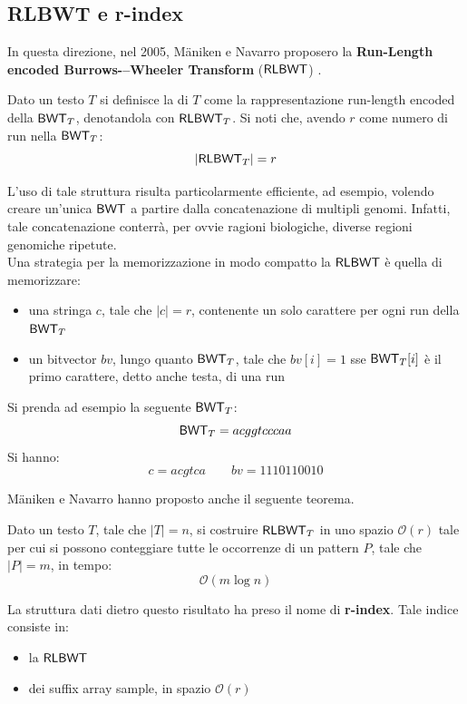 \subsection{RLBWT e r-index}
In questa direzione, nel 2005, M\"{a}niken e Navarro proposero la
\textbf{Run-Length encoded Burrows-–Wheeler Transform} ($\mbox{\rm {\sf RLBWT}}$)
\cite{rlbwt}.
\begin{definizione}
  Dato un testo $T$ si definisce la \RLBWT di $T$
  come la rappresentazione run-length encoded della $\mbox{\rm {\sf BWT}}_T$,
  denotandola con $\mbox{\rm {\sf RLBWT}}_T$. Si noti che, avendo $r$ come numero di run nella
  $\mbox{\rm {\sf BWT}}_T$: 
  \begin{equation}
    \label{eq:rlbwt1}
    |\mbox{\rm {\sf RLBWT}}_T|=r
  \end{equation}
\end{definizione}
L'uso di tale
struttura risulta particolarmente efficiente, ad esempio, volendo creare
un'unica $\mbox{\rm {\sf BWT}}$ a partire dalla concatenazione di multipli
genomi. Infatti, tale
concatenazione conterrà, per ovvie ragioni biologiche, diverse regioni genomiche
ripetute. \\
Una strategia per la memorizzazione in modo compatto la $\mbox{\rm {\sf RLBWT}}$ è quella
di memorizzare: 
\begin{itemize}
  \item una stringa $c$, tale che $|c|=r$, contenente un solo carattere per ogni
  run della $\mbox{\rm {\sf BWT}}_T$
  \item un bitvector $bv$, lungo quanto $\mbox{\rm {\sf BWT}}_T$, tale che $bv[i]=1$ sse
  $\mbox{\rm {\sf BWT}}_T[i]$ è il primo carattere, detto anche testa, di una run 
\end{itemize}
\begin{esempio}
  Si prenda ad esempio la seguente $\mbox{\rm {\sf BWT}}_T$:
  \[\mbox{\rm {\sf BWT}}_T=acggtcccaa\]
  Si hanno:
  \[c=acgtca\quad \quad bv=1110110010\]
\end{esempio}
M\"{a}niken e Navarro hanno proposto anche il seguente teorema.
\begin{teorema}
  Dato un testo $T$, tale che $|T|=n$, si costruire $\mbox{\rm {\sf RLBWT}}_T$ in
  uno spazio $\mathcal{O}(r)$ tale per cui si possono conteggiare tutte le
  occorrenze di un pattern $P$, tale che $|P|=m$, in tempo:
  \begin{equation}
    \label{eq:rlbwt2}
    \mathcal{O}(m\log n)
  \end{equation}
\end{teorema}
\noindent
La struttura dati dietro questo risultato ha preso il nome di \textbf{r-index}.
Tale indice consiste in: 
\begin{itemize}
  \item la $\mbox{\rm {\sf RLBWT}}$
  \item dei suffix array sample, in spazio $\mathcal{O}(r)$
\end{itemize}
